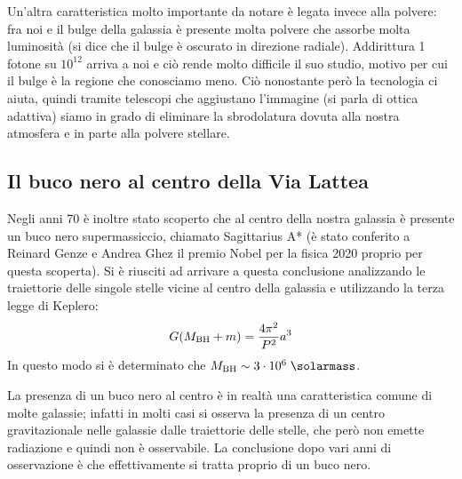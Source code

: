 Un'altra caratteristica molto importante da notare è legata invece alla polvere: fra noi e il bulge della galassia è presente molta polvere che assorbe molta luminosità (si dice che il bulge è oscurato in direzione radiale). Addirittura 1 fotone su $10^{12}$ arriva a noi e ciò rende molto difficile il suo studio, motivo per cui il bulge è la regione che conosciamo meno. Ciò nonostante però la tecnologia ci aiuta, quindi tramite telescopi che aggiustano l'immagine (si parla di ottica adattiva) siamo in grado di eliminare la sbrodolatura dovuta alla nostra atmosfera e in parte alla polvere stellare. 

\subsection{Il buco nero al centro della Via Lattea}
Negli anni 70 è inoltre stato scoperto che al centro della nostra galassia è presente un buco nero supermassiccio, chiamato Sagittarius A* (è stato conferito a Reinard Genze e Andrea Ghez il premio Nobel per la fisica 2020 proprio per questa scoperta). Si è riusciti ad arrivare a questa conclusione analizzando le traiettorie delle singole stelle vicine al centro della galassia e utilizzando la terza legge di Keplero: 
\begin{equation*}
    G(M_\textup{BH} + m) = \frac{4\pi^2}{P^2}a^3
\end{equation*}
In questo modo si è determinato che $M_\textup{BH} \sim 3 \cdot 10^6 \;\si{\solarmass}$.

La presenza di un buco nero al centro è in realtà una caratteristica comune di molte galassie; infatti in molti casi si osserva la presenza di un centro gravitazionale nelle galassie dalle traiettorie delle stelle, che però non emette radiazione e quindi non è osservabile. La conclusione dopo vari anni di osservazione è che effettivamente si tratta proprio di un buco nero.

